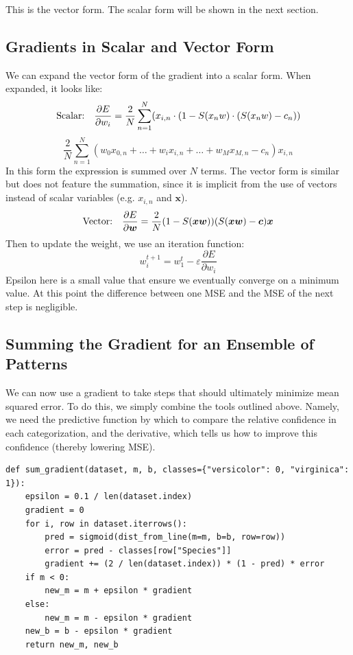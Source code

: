 \documentclass[letterpaper]{article}
\begin{document}
This is the vector form. The scalar form will be shown in the next section.

\subsection{Gradients in Scalar and Vector Form}

We can expand the vector form of the gradient into a scalar form.
When expanded, it looks like:
\begin{equation*}
\text{Scalar:\quad} \frac{\partial E}{\partial w_i} = \frac{2}{N}\sum_{n=1}^N(x_{i,n}\cdot(1-S(x_n w)\cdot(S(x_n w)-c_n))
\end{equation*}
\begin{equation*}
\frac{2}{N}\sum_{n=1}^N(w_0x_{0,n}+\ldots+w_ix_{i,n}+\ldots+w_Mx_{M,n}-c_n)x_{i,n}
\end{equation*}
In this form the expression is summed over $N$ terms. The vector form is similar but
does not feature the summation, since it is implicit from the use of vectors
instead of scalar variables (e.g. $x_{i,n}$ and $\boldsymbol{x}$).
\begin{equation*}
\text{Vector:\quad} \frac{\partial E}{\partial\boldsymbol{w}} = \frac{2}{N}(1-S(\boldsymbol{x}\boldsymbol{w}))(S(\boldsymbol{x}\boldsymbol{w})-\boldsymbol{c})\boldsymbol{x}
\end{equation*}
Then to update the weight, we use an iteration function:
\begin{equation*}
w_i^{t+1}=w_1^t-\varepsilon\frac{\partial E}{\partial w_i}
\end{equation*}
Epsilon here is a small value that ensure we eventually converge on a minimum value.
At this point the difference between one MSE and the MSE of the next step is
negligible.

\subsection{Summing the Gradient for an Ensemble of Patterns}

We can now use a gradient to take steps that should ultimately minimize mean
squared error. To do this, we simply combine the tools outlined above.
Namely, we need the predictive function by which to compare the relative
confidence in each categorization, and the derivative, which tells us how to
improve this confidence (thereby lowering MSE).

\begin{verbatim}
def sum_gradient(dataset, m, b, classes={"versicolor": 0, "virginica": 1}):
    epsilon = 0.1 / len(dataset.index)
    gradient = 0
    for i, row in dataset.iterrows():
        pred = sigmoid(dist_from_line(m=m, b=b, row=row))
        error = pred - classes[row["Species"]]
        gradient += (2 / len(dataset.index)) * (1 - pred) * error
    if m < 0:
        new_m = m + epsilon * gradient
    else:
        new_m = m - epsilon * gradient
    new_b = b - epsilon * gradient
    return new_m, new_b
\end{verbatim}
\end{document}
